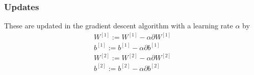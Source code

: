 \subsubsection{Updates}
These are updated in the gradient descent algorithm with a learning rate $\alpha$ by 
\begin{equation}
  \begin{aligned}
    W^{[1]} := W^{[1]} - \alpha \partial W^{[1]} \\
    b^{[1]} := b^{[1]} - \alpha \partial b^{[1]} \\
    W^{[2]} := W^{[2]} - \alpha \partial W^{[2]} \\
    b^{[2]} := b^{[2]} - \alpha \partial b^{[2]}
  \end{aligned}
\end{equation}